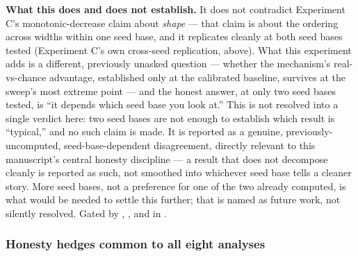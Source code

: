 \documentclass[
  english,
]{article}
\theoremstyle{definition}
\begin{document}
\textbf{What this does and does not establish.} It does not contradict
Experiment C's monotonic-decrease claim about \emph{shape} --- that
claim is about the ordering across widths within one seed base, and it
replicates cleanly at both seed bases tested (Experiment C's own
cross-seed replication, above). What this experiment adds is a
different, previously unasked question --- whether the mechanism's
real-vs-chance advantage, established only at the calibrated baseline,
survives at the sweep's most extreme point --- and the honest answer, at
only two seed bases tested, is ``it depends which seed base you look
at.'' This is not resolved into a single verdict here: two seed bases
are not enough to establish which result is ``typical,'' and no such
claim is made. It is reported as a genuine, previously-uncomputed,
seed-base-dependent disagreement, directly relevant to this manuscript's
central honesty discipline --- a result that does not decompose cleanly
is reported as such, not smoothed into whichever seed base tells a
cleaner story. More seed bases, not a preference for one of the two
already computed, is what would be needed to settle this further; that
is named as future work, not silently resolved. Gated by
,
,
and
in .

\subsubsection{Honesty hedges common to all eight
analyses}\label{honesty-hedges-common-to-all-eight-analyses}
\end{document}
